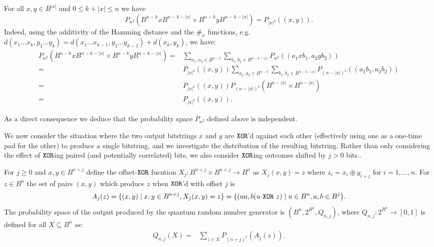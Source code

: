 \documentclass[%
 preprint,
 showpacs,
 showkeys,
 preprintnumbers,
  amsmath,amssymb,
  aps,
 pra,
  longbibliography,
  floatfix,
 ]{revtex4-1}
\newtheorem{Proposition}[Theorem]{Proposition}
\newtheorem{Fact}[Theorem]{Fact}
\newtheorem{Lemma}[Theorem]{Lemma}
\theoremstyle{definition}
\newcommand{\xor}{\text{ ${\tt XOR}$ }}
\begin{document}
	For all $x,y \in B^{|x|}$ and $0\le k + |x| \le n$ we have
	$$P_{n^2}(B^{n-k}xB^{n-k-|x|} \times B^{n-k}yB^{n-k-|x|}) = P_{|x|^2}((x,y)).$$
	Indeed, using the additivity of the Hamming distance and the $\#_x$ functions, e.g. $d(x_1\dots x_k, y_1\dots y_k)=d(x_1\dots x_{k-1},y_1\dots y_{k-1})+d(x_k,y_k)$, we have:
	\begin{align*}
		P_{n^2}(B^{n-k}xB^{n-k-|x|} \times B^{n-k}yB^{n-k-|x|}) =& \sum_{a_1,a_2 \in B^{n-k}}\sum_{b_1,b_2\in B^{n-k-|x|}}P_{n^2}\left((a_1 x b_1,a_2 y b_2) \right)\\
		=& P_{|x|^2}((x,y))\sum_{a_1,a_2 \in B^{n-k}}\sum_{b_1,b_2\in B^{n-k-|x|}}P_{(n-|x|)^2}\left((a_1 b_1,a_2 b_2) \right)\\
		=& P_{|x|^2}((x,y)) P_{(n-|x|)^2}(B^{n-|x|}\times B^{n-|x|})\\
		=& P_{|x|^2}((x,y)).
	\end{align*}



	As a direct consequence we deduce that the probability space $P_{n^2}$  defined above
	is independent.


We now consider the situation where the two output bitstrings $x$ and $y$ are ${\tt XOR}$'d against each other (effectively using one as a one-time pad for the other)
to produce a single bitstring, and we investigate the distribution of the resulting bitstring.
Rather than only considering the effect of ${\tt XOR}$ing paired (and potentially correlated) bits,
we also consider ${\tt XOR}$ing outcomes shifted by $j>0$ bits..

For $j\ge 0$ and $x,y \in B^{n+j}$ define the offset-${\tt XOR}$ fucntion $X_j: B^{n+j} \times B^{n+j} \to B^n$ as $X_j(x,y) = z$ where $z_i = x_i \oplus y_{i+j}$ for $i=1,\dots,n$. For $z \in B^n$ the set of pairs $(x,y)$ which produce $z$ when ${\tt XOR}$'d with offset $j$ is
\[	A_j(z) = \{(x,y) \mid x,y \in B^{n+j}, X_j(x,y)=z \}%
	= \{(ua,b(u \xor z) \mid u \in B^n, a,b\in B^j \}.\]
 The probability space of the output produced by the quantum random number generator is $(B^n,2^{B^n},Q_{n,j})$, where $Q_{n,j}: 2^{B^n} \to [0,1]$ is defined for all $X\subseteq B^n$ as:
\begin{align}\label{QProbDefn}
	Q_{n,j}(X) =& \sum_{z\in X}P_{(n+j)^2}(A_j(z)).
\end{align}
\end{document}
